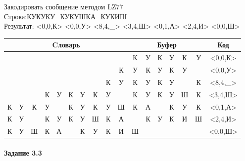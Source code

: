 \documentclass[a4paper, 12pt]{article}
\begin{document}
Закодировать сообщение методом LZ77\\
Строка:КУКУКУ\_КУКУШКА\_КУКИШ\\
Результат: <0,0,К> <0,0,У> <8,4,\_> <3,4,Ш> <0,1,А> <2,4,И> <0,0,Ш>\\
\begin{table}[h!]
\centering
\begin{tabular}{|c|c|c|c|c|c|c|c|c|c|c|c|c|c|c|c|c|} 
\hline
\multicolumn{10}{|c|}{Cловарь} & \multicolumn{6}{c|}{Буфер} & Код  \\ \hline
  &   &   &   &   &   &   &   &   &   & \cellcolor[HTML]{8CE4F6} К & У & К & У & К & У & <0,0,К>
\\ \hline
  &   &   &   &   &   &   &   &   & К & \cellcolor[HTML]{8CE4F6} У & К & У & К & У &   & <0,0,У>
\\ \hline
  &   &   &   &   &   &   &   & \cellcolor[HTML]{FFFF00} К & \cellcolor[HTML]{FFFF00} У & \cellcolor[HTML]{FFFF00} К & \cellcolor[HTML]{FFFF00} У & \cellcolor[HTML]{FFFF00} К & \cellcolor[HTML]{FFFF00} У & \cellcolor[HTML]{8CE4F6}   & К & <8,4,\_>
\\ \hline
  &   &   & \cellcolor[HTML]{FFFF00} К & \cellcolor[HTML]{FFFF00} У & \cellcolor[HTML]{FFFF00} К & \cellcolor[HTML]{FFFF00} У & К & У &   & \cellcolor[HTML]{FFFF00} К & \cellcolor[HTML]{FFFF00} У & \cellcolor[HTML]{FFFF00} К & \cellcolor[HTML]{FFFF00} У & \cellcolor[HTML]{8CE4F6} Ш & К & <3,4,Ш>
\\ \hline
\cellcolor[HTML]{FFFF00} К & У & К & У &   & К & У & К & У & Ш & \cellcolor[HTML]{FFFF00} К & \cellcolor[HTML]{8CE4F6} А &   & К & У & К & <0,1,А>
\\ \hline
К & У & \cellcolor[HTML]{FFFF00}   & \cellcolor[HTML]{FFFF00} К & \cellcolor[HTML]{FFFF00} У & \cellcolor[HTML]{FFFF00} К & У & Ш & К & А & \cellcolor[HTML]{FFFF00}   & \cellcolor[HTML]{FFFF00} К & \cellcolor[HTML]{FFFF00} У & \cellcolor[HTML]{FFFF00} К & \cellcolor[HTML]{8CE4F6} И & Ш & <2,4,И>
\\ \hline
К & У & Ш & К & А &   & К & У & К & И & \cellcolor[HTML]{8CE4F6} Ш &   &   &   &   &   & <0,0,Ш>
\\ \hline
\end{tabular}
\end{table}

\paragraph{Задание 3.3}
\end{document}
